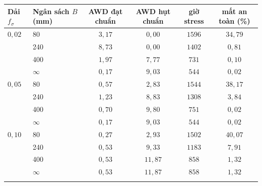 
\begin{tabular}{@{}llcccc@{}}
\toprule
Dải $f_\sigma$ & Ngân sách $B$ (mm) & AWD đạt chuẩn & AWD hụt chuẩn & giờ stress & mất an toàn (\%) \\
\midrule
$0{,}02$ & 80 & $3{,}17$ & $0{,}00$ & $1596$ & $34{,}79$ \\
 & 240 & $8{,}73$ & $0{,}00$ & $1402$ & $0{,}81$ \\
 & 400 & $1{,}97$ & $7{,}77$ & $731$ & $0{,}10$ \\
 & $\infty$ & $0{,}17$ & $9{,}03$ & $544$ & $0{,}02$ \\
\addlinespace[2pt]
$0{,}05$ & 80 & $0{,}57$ & $2{,}83$ & $1544$ & $38{,}17$ \\
 & 240 & $1{,}23$ & $8{,}83$ & $1308$ & $3{,}84$ \\
 & 400 & $0{,}70$ & $9{,}80$ & $751$ & $0{,}02$ \\
 & $\infty$ & $0{,}17$ & $9{,}03$ & $544$ & $0{,}02$ \\
\addlinespace[2pt]
$0{,}10$ & 80 & $0{,}27$ & $2{,}93$ & $1502$ & $40{,}07$ \\
 & 240 & $0{,}53$ & $9{,}33$ & $1183$ & $7{,}91$ \\
 & 400 & $0{,}53$ & $11{,}87$ & $858$ & $1{,}32$ \\
 & $\infty$ & $0{,}53$ & $11{,}87$ & $858$ & $1{,}32$ \\
\addlinespace[2pt]
\bottomrule
\end{tabular}
